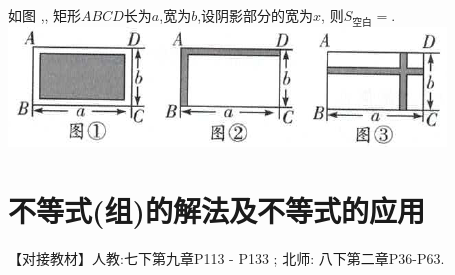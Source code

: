 \documentclass[cn,blue,12pt]{elegantbook}
\renewcommand \tkt[1]{{\CJKunderline[hidden=true, skip=true, thickness=1pt]{#1}}}
\begin{document}
\begin{zsyd}
\begin{zsyd}
        如图 ,, 矩形\(ABCD\)长为\(a\),宽为\(b\),设阴影部分的宽为\(x\), 则\(S_\text{空白}=\)\tkt{\((a-x)(b-x)\)}.\\
        \includegraphics[width=0.5\linewidth]{pic/20200510001.png}
    \end{zsyd}
\end{zsyd}
\chapter{不等式(组)的解法及不等式的应用}%
\label{cha:不等式(组)的解法及不等式的应用}

\begin{note}
    【对接教材】人教:七下第九章P113 - P133 ; 北师: 八下第二章P36-P63.
\end{note}
\end{document}
